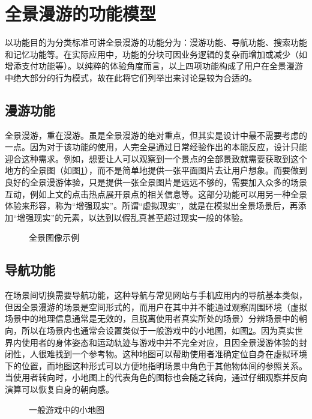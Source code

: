 \section{全景漫游的功能模型}
以功能目的为分类标准可讲全景漫游的功能分为：漫游功能、导航功能、搜索功能和记忆功能等。在实际应用中，功能的分块可因业务逻辑的复杂而增加或减少（如增添支付功能等）。以纯粹的体验角度而言，以上四项功能构成了用户在全景漫游中绝大部分的行为模式，故在此将它们列举出来讨论是较为合适的。

\subsection{漫游功能}
全景漫游，重在漫游。虽是全景漫游的绝对重点，但其实是设计中最不需要考虑的一点。因为对于该功能的使用，人完全是通过日常经验作出的本能反应，设计只能迎合这种需求。例如，想要让人可以观察到一个景点的全部景致就需要获取到这个地方的全景图（如图\ref{fig:hongcun}），而不是简单地提供一张平面图片去让用户想象。而要做到良好的全景漫游体验，只是提供一张全景图片是远远不够的，需要加入众多的场景互动，例如上文的点击热点展开景点的相关信息等。这部分功能可以用另一种全景体验来形容，称为“增强现实”。所谓“虚拟现实”，就是在模拟出全景场景后，再添加“增强现实”的元素，以达到以假乱真甚至超过现实一般的体验。

\begin{figure}[htp]
\centering
{}
\caption{全景图像示例}
\label{fig:hongcun}
\end{figure}

\subsection{导航功能}
在场景间切换需要导航功能，这种导航与常见网站与手机应用内的导航基本类似，但因全景漫游的场景是空间形式的，而用户在其中并不能通过观察周围环境（虚拟场景中的地理信息通常是无效的，且脱离使用者真实所处的场景）分辨场景中的朝向，所以在场景内也通常会设置类似于一般游戏中的小地图，如图\ref{fig:minimap}。因为真实世界内使用者的身体姿态和运动轨迹与游戏中并不完全对应，且因全景漫游体验的封闭性，人很难找到一个参考物。这种地图可以帮助使用者准确定位自身在虚拟环境下的位置，而地图这种形式可以方便地指明场景中角色于其他物体间的参照关系。当使用者转向时，小地图上的代表角色的图标也会随之转向，通过仔细观察并反向演算可以恢复自身的朝向感。

\begin{figure}[htp]
\centering
{}
\caption{一般游戏中的小地图}
\label{fig:minimap}
\end{figure}

